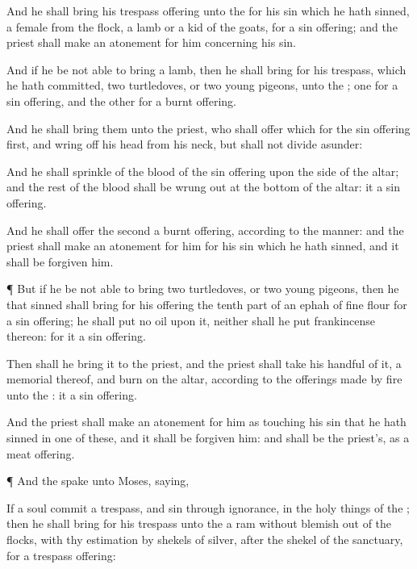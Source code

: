 {And he shall
bring his trespass
offering unto the
{} for his
sin which he hath
sinned, a
female from the
flock, a
lamb or a
kid of the
goats, for a sin
offering; and the
priest shall make an
atonement for him concerning his
sin.


\par }{\PP {}And if
he be not
able to
bring a
lamb, then he shall
bring
for his
trespass, which he hath
committed,
two
turtledoves, or
two
young
pigeons, unto the
{};
one for a sin
offering, and the
other for a burnt
offering.

And he shall
bring them unto the
priest, who shall
offer
{} which
{} for the sin
offering
first, and wring
off his
head
from his
neck, but shall not divide
{}
asunder:

And he shall
sprinkle of the
blood of the sin
offering upon the
side of the
altar; and the
rest of the
blood shall be wrung
out at the
bottom of the
altar: it
{} a sin
offering.

And he shall
offer the
second
{} a burnt
offering, according to the
manner: and the
priest shall make an
atonement for him for his
sin which he hath
sinned, and it shall be
forgiven him.


\par }{\PP {}¶ But if
he be not able to
bring
two
turtledoves, or
two
young
pigeons, then he that
sinned shall
bring for his
offering the
tenth part of an
ephah of fine
flour for a sin
offering; he shall
put no
oil upon it, neither shall he
put
{}
frankincense thereon: for it
{} a sin
offering.

Then shall he
bring it to the
priest, and the
priest shall
take his
handful of it,
{} a
memorial thereof, and
burn
{} on the
altar, according to the offerings made by
fire unto the
{}: it
{} a sin
offering.

And the
priest shall make an
atonement for him as touching his
sin that he hath
sinned in
one of these, and it shall be
forgiven him: and
{} shall be the
priest’s, as a meat
offering.


\par }{\PP {}¶ And the
{}
spake unto
Moses,
saying,

If a
soul
commit a
trespass, and
sin through
ignorance, in the holy
things of the
{}; then he shall
bring for his
trespass unto the
{} a
ram without
blemish out of the
flocks, with thy
estimation by
shekels of
silver, after the
shekel of the
sanctuary, for a trespass
offering:

}
